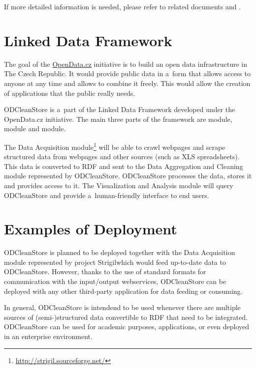 If more detailed information is needed, please refer to related documents  and .


\section{Linked Data Framework}

The goal of the \href{http://opendata.cz}{OpenData.cz} initiative is to build an open data infrastructure in The Czech Republic. It would provide public data in a~form that allows access to anyone at any time and allows to combine it freely. This would allow the creation of applications that the public really needs.

ODCleanStore is a~part of the Linked Data Framework developed under the OpenData.cz initiative. The main three parts of the framework are  module,  module and  module.


The Data Acquisition module\footnote{\url{http://strigil.sourceforge.net/}} will be able to crawl webpages and scrape structured data from webpages and other sources (such as XLS spreadsheets). This data is converted to RDF and sent to the Data Aggregation and Cleaning module represented by ODCleanStore. ODCleanStore processes the data, stores it and provides access to it. The Visualization and Analysis module will query ODCleanStore and provide a~human-friendly interface to end users.


\section{Examples of Deployment}

ODCleanStore is planned to be deployed together with the Data Acquisition module represented by project Strigil\footnotemark[\thefootnote] which would feed up-to-date data to ODCleanStore. However, thanks to the use of standard formats for communication with the input/output webservices, ODCleanStore can be deployed with any other third-party application for data feeding or consuming.

In general, ODCleanStore is intendend to be used whenever there are multiple sources of (semi-)structured data convertible to RDF that need to be integrated. ODCleanStore can be used for academic purposes,  applications, or even deployed in an enterprise environment.

